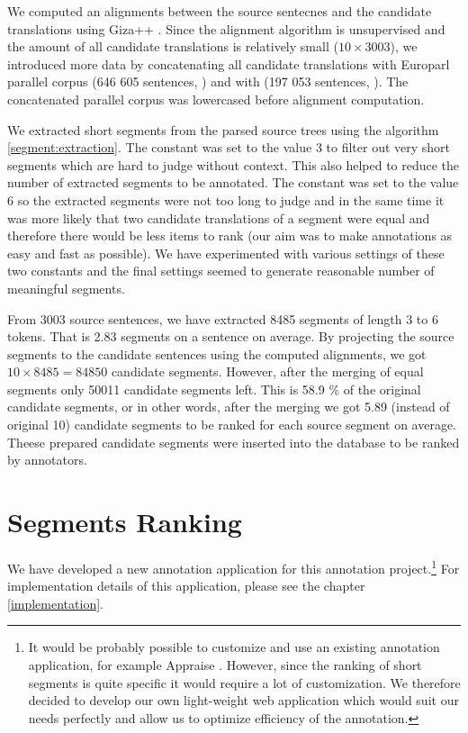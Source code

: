 We computed an alignments between the source sentecnes and the candidate
translations using Giza++ . Since the alignment algorithm is
unsupervised and the amount of all candidate translations is relatively small
($10 \times 3003$), we introduced more data by concatenating all candidate
translations with Europarl parallel corpus (646 605 sentences, )
and with  (197 053 sentences, ).  The
concatenated parallel corpus was lowercased before alignment computation. 

We extracted short segments from the parsed source trees using the algorithm
\ref{segment:extraction}. The constant  was set to
the value 3 to filter out very short segments which are hard to judge without
context. This also helped to reduce the number of extracted segments to be
annotated. The constant  was set to the value 6 so
the extracted segments were not too long to judge and in the same time it was
more likely that two candidate translations of a segment were equal and
therefore there would be less items to rank (our aim was to make annotations as
easy and fast as possible). We have experimented with various settings of these
two constants and the final settings seemed to generate reasonable number of
meaningful segments.


From 3003 source sentences, we have extracted 8485 segments of length 3 to 6
tokens. That is  2.83 segments on a sentence on average. By
projecting the source segments to the candidate sentences using the computed
alignments, we got $10 \times 8485 = 84850$ candidate segments. However, after
the merging of equal segments only 50011 candidate segments left. This is 58.9
\% of the original candidate segments, or in other words, after the merging we
got 5.89 (instead of original 10) candidate segments to be ranked for each
source segment on average. Theese prepared candidate segments were inserted
into the database to be ranked by annotators.

\section{Segments Ranking}

We have developed a new annotation application for this annotation
project.\footnote{It would be probably possible to customize and use an
    existing annotation application, for example Appraise
    .  However, since the ranking of short segments is
    quite specific it would require a lot of customization. We therefore
decided to develop our own light-weight web application which would suit our
needs perfectly and allow us to optimize efficiency of the annotation.} For
implementation details of this application, please see the chapter
\ref{implementation}.

